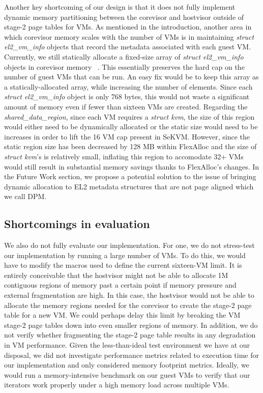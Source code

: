 Another key shortcoming of our design is that it does not fully implement
dynamic memory partitioning between the corevisor and hostvisor outside of stage-2 page tables for VMs. As mentioned in
the introduction, another area in which corevisor memory scales with the number
of VMs is in maintaining \textit{struct el2\_vm\_info} objects that record the
metadata associated with each guest VM. Currently, we still statically allocate
a fixed-size array of \textit{struct el2\_vm\_info} objects in corevisor
memory ~\cite{hypsec_host.h}. This essentially preserves the hard cap on the
number of guest VMs that can be run. An easy fix would be to keep this array
as a statically-allocated array, while increasing the number of elements. Since each
\textit{struct el2\_vm\_info} object is only 768 bytes, this would not waste a
significant amount of memory even if fewer than sixteen VMs are created. Regarding the
\textit{shared\_data\_region}, since each VM requires a \textit{struct kvm}, the size of
this region would either need to be dynamically allocated or the static size would
need to be increases in order to lift the 16 VM cap present in SeKVM. However, since the static region
size has been decreased by 128 MB within FlexAlloc and the size of \textit{struct kvm}'s is relatively
small, inflating this region to accomodate 32+ VMs would still result in substantial memory savings
thanks to FlexAlloc's changes. In the Future Work section, we propose a potential solution to
the issue of bringing dynamic allocation to EL2 metadata structures that are not page aligned
which we call DPM.


\subsection{Shortcomings in evaluation}

We also do not fully evaluate our implementation. For one, we do not stress-test our implementation by running a large number
of VMs. To do this, we would have to modify the macros used to define the current
sixteen-VM limit. It is entirely conceivable that the hostvisor might not be able
to allocate 1M contiguous regions of memory past a certain point if memory
pressure and external fragmentation are high. In this case, the hostvisor would
not be able to allocate the memory regions needed for the corevisor to create
the stage-2 page table for a new VM. We could perhaps delay this limit by breaking
the VM stage-2 page tables down into even smaller regions of memory. In addition, we do not verify whether fragmenting the stage-2 page table results
in any degradation in VM performance. Given the less-than-ideal test environment
we have at our disposal, we did not investigate performance metrics related to execution time
for our implementation and only considered memory footprint metrics. Ideally, we would run a memory-intensive
benchmark on our guest VMs to verify that our iterators work properly under a
high memory load across multiple VMs.

